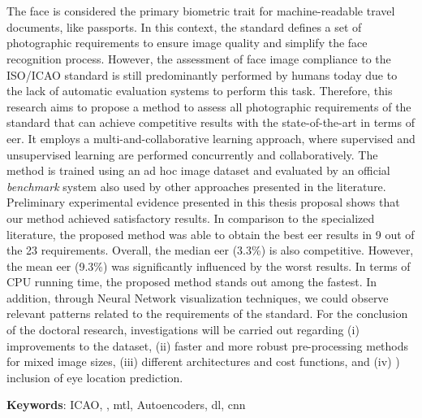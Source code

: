 \section*{}

The face is considered the primary biometric trait for machine-readable travel documents, like passports. In this context, the \icao standard defines a set of photographic requirements to ensure image quality and simplify the face recognition process. However, the assessment of face image compliance to the ISO/ICAO standard is still predominantly performed by humans today due to the lack of automatic evaluation systems to perform this task. Therefore, this research aims to propose a method to assess all photographic requirements of the \icao standard that can achieve competitive results with the state-of-the-art in terms of \acf{eer}. It employs a multi-and-collaborative learning approach, where supervised and unsupervised learning are performed concurrently and collaboratively. The method is trained using an ad hoc image dataset and evaluated by an official \textit{benchmark} system also used by other approaches presented in the literature. Preliminary experimental evidence presented in this thesis proposal shows that our method achieved satisfactory results. In comparison to the specialized literature, the proposed method was able to obtain the best \acs{eer} results in 9 out of the 23 requirements. Overall, the median \acs{eer} (3.3\%) is also competitive. However, the mean \acs{eer} (9.3\%) was significantly influenced by the worst results. In terms of CPU running time, the proposed method stands out among the fastest. In addition, through Neural Network visualization techniques, we could observe relevant patterns related to the requirements of the \icao standard. For the conclusion of the doctoral research, investigations will be carried out regarding (i) improvements to the dataset, (ii) faster and more robust pre-processing methods for mixed image sizes, (iii) different architectures and cost functions, and (iv) ) inclusion of eye location prediction.

\vspace{2em}

\noindent
\textbf{Keywords}: ICAO, \icao, \acl{mtl}, Autoencoders, \acl{dl}, \acl{cnn}

\newpage
